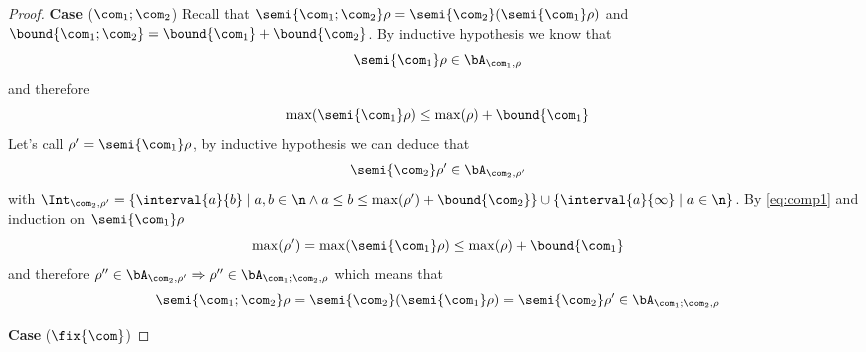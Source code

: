 \begin{proof}
  \medskip

  \noindent
  \textbf{Case} (\(\com_1 ; \com_2\)) Recall that
  \(\semi{\com_1 ; \com_2}\rho = \semi{\com_2}(\semi{\com_1}\rho)\) and
  \(\bound{\com_1 ; \com_2} = \bound{\com_1} + \bound{\com_2}\). By
  inductive hypothesis we know that
  \begin{equation*}
    \semi{\com_1}\rho \in \bA_{\com_1, \rho}
  \end{equation*}
  and therefore
  \begin{equation}\label{eq:comp1}
    \max(\semi{\com_1}\rho) \leq \max(\rho) + \bound{\com_1}
  \end{equation}
  Let's call \(\rho' = \semi{\com_1}\rho\), by inductive hypothesis we
  can deduce that
  \begin{equation*}
    \semi{\com_2}\rho' \in \bA_{\com_2, \rho'}
  \end{equation*}
  with
  \(\Int_{\com_2, \rho'} = \{\interval{a}{b} \mid a,b \in \n \wedge a
  \leq b \leq \max(\rho') + \bound{\com_2}\} \cup
  \{\interval{a}{\infty} \mid a \in \n\}\). By \eqref{eq:comp1} and
  induction on \(\semi{\com_1}\rho\)
  \begin{equation*}
    \max(\rho') = \max(\semi{\com_1}\rho) \leq \max(\rho) + \bound{\com_1}
  \end{equation*}
  and therefore
  \(\rho'' \in \bA_{\com_2, \rho'} \Rightarrow \rho'' \in
  \bA_{\com_1;\com_2, \rho}\) which means that
  \begin{equation*}
    \semi{\com_1;\com_2}\rho = \semi{\com_2}(\semi{\com_1}\rho) = \semi{\com_2}\rho' \in \bA_{\com_1;\com_2, \rho}
  \end{equation*}

  \medskip

  \noindent
  \textbf{Case} (\(\fix{\com}\))
\end{proof}